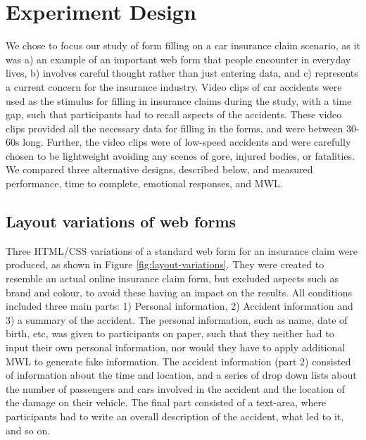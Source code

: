 \documentclass[../main/Feedback.tex]{subfiles}
\begin{document}
\section{Experiment Design}
We chose to focus our study of form filling on a car insurance claim scenario, as it was a) an example of an important web form that people encounter in everyday lives, b) involves careful thought rather than just entering data, and c) represents a current concern for the insurance industry. Video clips of car accidents were used as the stimulus for filling in insurance claims during the study, with a time gap, such that participants had to recall aspects of the accidents. These video clips provided all the necessary data for filling in the forms, and were between 30-60s long.
Further, the video clips were of low-speed accidents and were carefully chosen to be lightweight avoiding any scenes of gore, injured bodies, or fatalities. We compared three alternative designs, described below, and measured performance, time to complete, emotional responses, and MWL.

\subsection{Layout variations of web forms}
Three HTML/CSS variations of a standard web form for an insurance claim were produced, as shown in Figure \ref{fig:layout-variations}.
They were created to resemble an actual online insurance claim form, but excluded aspects such as brand and colour, to avoid these having an impact on the results.
All conditions included three main parts: 1) Personal information, 2) Accident information and 3) a summary of the accident.
The personal information, such as name, date of birth, etc, was given to participants on paper, such that they neither had to input their own personal information, nor would they have to apply additional MWL to generate fake information.
The accident information (part 2) consisted of information about the time and location, and a series of drop down lists about the number of passengers and cars involved in the accident and the location of the damage on their vehicle.
The final part consisted of a text-area, where participants had to write an overall description of the accident, what led to it, and so on.
\end{document}
